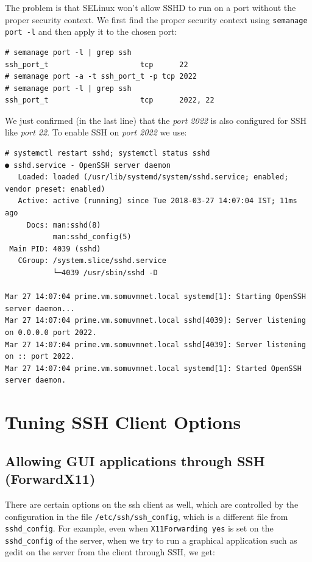 \noindent
The problem is that SELinux won't allow SSHD to run on a port without the proper security context. We first find the proper security context using \verb|semanage port -l| and then apply it to the chosen port:

\vspace{-15pt}
\begin{verbatim}
# semanage port -l | grep ssh
ssh_port_t                     tcp      22
# semanage port -a -t ssh_port_t -p tcp 2022
# semanage port -l | grep ssh
ssh_port_t                     tcp      2022, 22
\end{verbatim}
\vspace{-10pt}	

\noindent
We just confirmed (in the last line) that the \textit{port 2022} is also configured for SSH like \textit{port 22}. To enable SSH on \textit{port 2022} we use: 

\vspace{-15pt}
\begin{verbatim}
# systemctl restart sshd; systemctl status sshd
● sshd.service - OpenSSH server daemon
   Loaded: loaded (/usr/lib/systemd/system/sshd.service; enabled; vendor preset: enabled)
   Active: active (running) since Tue 2018-03-27 14:07:04 IST; 11ms ago
     Docs: man:sshd(8)
           man:sshd_config(5)
 Main PID: 4039 (sshd)
   CGroup: /system.slice/sshd.service
           └─4039 /usr/sbin/sshd -D

Mar 27 14:07:04 prime.vm.somuvmnet.local systemd[1]: Starting OpenSSH server daemon...
Mar 27 14:07:04 prime.vm.somuvmnet.local sshd[4039]: Server listening on 0.0.0.0 port 2022.
Mar 27 14:07:04 prime.vm.somuvmnet.local sshd[4039]: Server listening on :: port 2022.
Mar 27 14:07:04 prime.vm.somuvmnet.local systemd[1]: Started OpenSSH server daemon.
\end{verbatim}
\vspace{-10pt}	

	\section{Tuning SSH Client Options}
\subsection{Allowing GUI applications through SSH (ForwardX11)}
There are certain options on the ssh client as well, which are controlled by the configuration in the file \verb|/etc/ssh/ssh_config|, which is a different file from \verb|sshd_config|. For example, even when \verb|X11Forwarding yes| is set on the \verb|sshd_config| of the server, when we try to run a graphical application such as gedit on the server from the client through SSH, we get:

